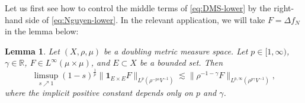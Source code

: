 \documentclass[11pt]{amsart}
\newtheorem{lemma}[theorem]{Lemma}
\theoremstyle{definition}
\theoremstyle{remark}
\numberwithin{equation}{section}
\newcommand{\Norm}[2]{\|#1\|_{#2}}
\begin{document}
Let us first see how to control the middle terms of \eqref{eq:DMS-lower} by the right-hand
side of \eqref{eq:Nguyen-lower}. In the relevant application, we will take $F=\Delta f_N$ in
the lemma below:

\begin{lemma}\label{lem:BSVY963}
Let $(X,\rho,\mu)$ be a doubling metric measure space.
Let $p\in[1,\infty)$, $\gamma\in\mathbb{R}$,
$F\in L^\infty(\mu\times\mu)$, and $E\subset X$ be a bounded set. Then
\begin{equation*}
  \limsup_{s\nearrow 1}(1-s)^{\frac1p}\Norm{\mathbf{1}_{E\times
  E}F}{L^{p}(\rho^{-ps}V^{-1})}
  \lesssim\Norm{\rho^{-1-\gamma}F}{L^{p,\infty}(\rho^{p\gamma}V^{-1})},
\end{equation*}
where the implicit positive constant depends only on $p$ and $\gamma$.
\end{lemma}
\end{document}
